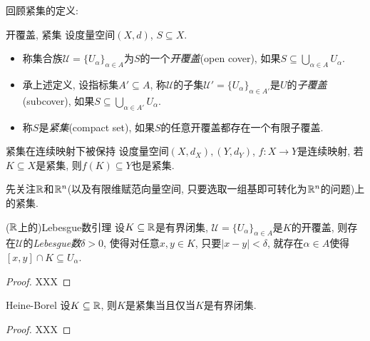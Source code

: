 回顾紧集的定义: 

\begin{definition}{开覆盖, 紧集}
	设度量空间$(X,d)$, $S \subseteq X$. 
	\begin{itemize}
		\item 称集合族$\mathcal{U} = \{ U_{\alpha} \}_{\alpha \in A}$为$S$的一个\textit{开覆盖}(open cover), 如果$S \subseteq \bigcup_{\alpha \in A} U_{\alpha}$. 
		\item 承上述定义, 设指标集$A' \subseteq A$, 称$\mathcal{U}$的子集$\mathcal{U}'= \{ U_{\alpha} \}_{\alpha \in A'}$是$U$的\textit{子覆盖}(subcover), 如果$S \subseteq \bigcup_{\alpha \in A'} U_{\alpha}$. 
		\item 称$S$是\textit{紧集}(compact set), 如果$S$的任意开覆盖都存在一个有限子覆盖. 
	\end{itemize}
\end{definition}

\begin{lemma}{紧集在连续映射下被保持}
	设度量空间$(X,d_X),(Y,d_Y)$, $f:X \to Y$是连续映射, 若$K \subseteq X$是紧集, 则$f(K) \subseteq Y$也是紧集. 
\end{lemma}

先关注$\mathbb{R}$和$\mathbb{R} ^n$(以及有限维赋范向量空间, 只要选取一组基即可转化为$\mathbb{R} ^n$的问题)上的紧集. 

\begin{proposition}{($\mathbb{R}$上的)Lebesgue数引理}
	设$K \subseteq \mathbb{R}$是有界闭集, $\mathcal{U} = \{ U_{\alpha} \}_{\alpha \in A}$是$K$的开覆盖, 则存在$\mathcal{U}$的\textit{Lebesgue数}$\delta >0$, 使得对任意$x,y \in K$, 只要$|x-y|<\delta$, 就存在$\alpha \in A$使得$[x,y] \cap K \subseteq U_{\alpha}$. 
\end{proposition}
\begin{proof}
	XXX
\end{proof}

\begin{theorem}{Heine-Borel}
	设$K \subseteq \mathbb{R}$, 则$K$是紧集当且仅当$K$是有界闭集. 
\end{theorem}
\begin{proof}
	XXX
\end{proof}